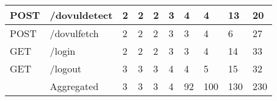 \begin{table*}[]
\begin{tabular}{|l|l|l|l|l|l|l|l|l|l|}
    POST                                  & /dovuldetect                       & 2                                          & 2                                          & 2                                          & 3                                          & 4                                          & 4                                          & 13                                         & 20                                          \\ \hline
    POST                                  & /dovulfetch                        & 2                                          & 2                                          & 2                                          & 3                                          & 3                                          & 4                                          & 6                                          & 27                                          \\ \hline
    GET                                   & /login                             & 2                                          & 2                                          & 2                                          & 3                                          & 3                                          & 4                                          & 14                                         & 33                                          \\ \hline
    GET                                   & /logout                            & 3                                          & 3                                          & 3                                          & 4                                          & 4                                          & 5                                          & 15                                         & 32                                          \\ \hline
                                          & Aggregated                         & 3                                          & 3                                          & 3                                          & 4                                          & 92                                         & 100                                        & 130                                        & 230                                         \\ \hline
    \end{tabular}
  \end{table*}